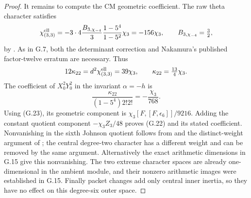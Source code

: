 \begin{proof}
It remains to compute the CM geometric coefficient. The raw theta
character satisfies
\[
 \chi^{\rm ell}_{(3,3)}
 =-3\cdot4\frac{B_{3,\chi_{-4}}}{3}
     \frac{1-5^4}{1-5^2}\chi_3=-156\chi_3,
 \qquad B_{3,\chi_{-4}}=\tfrac32,
\]
by \citet[Theorem 1.7]{IshiiGoto2026}. As in G.7, both the
determinant correction and Nakamura's published factor-twelve erratum
are necessary. Thus
\[
       12\kappa_{22}=d^2\chi^{\rm ell}_{(3,3)}=39\chi_3,
       \qquad \kappa_{22}=\tfrac{13}{4}\chi_3.
\]
The coefficient of $X_0^2Y_0^2$ in the invariant $\alpha=-h$ is
\[
 \frac{\kappa_{22}}{(1-5^4)2!2!}=-\frac{\chi_3}{768}.
\]
Using (G.23), its geometric component is
$\chi_3[F,[F,\epsilon_6]]/9216$. Adding the constant quotient
component $-\chi_3Z_3/48$ proves (G.22) and its stated coefficient.
Nonvanishing in the sixth Johnson quotient follows from
\citet[Corollary 4.10]{Ishii2025} and the distinct-weight argument
of \citet[Claim 4.14.1 and (4.14.2)]{Nakamura1995}; the central
degree-two character has a different weight and can be removed by
the same argument. Alternatively the exact arithmetic dimensions
in G.15 give this nonvanishing. The two extreme character spaces
are already one-dimensional in the ambient module, and their
nonzero arithmetic images were established in G.15. Finally
packet changes add only central inner inertia, so they have no
effect on this degree-six outer space.
\end{proof}

